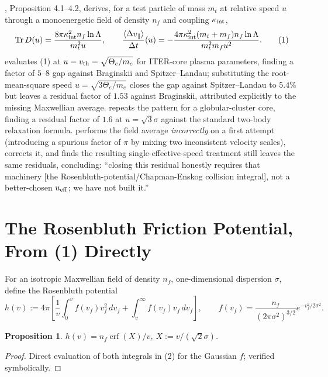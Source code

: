 \documentclass[12pt]{amsart}
\theoremstyle{plain}
\newtheorem{proposition}[theorem]{Proposition}
\theoremstyle{remark}
\begin{document}
\cite{Ebert2026Bath}, Proposition 4.1--4.2, derives, for a test particle of mass $m_t$ at relative speed $u$ through a monoenergetic field of density $n_f$ and coupling $\kappa_{\rm int}$,
\begin{equation}
\operatorname{Tr}D(u) = \frac{8\pi\kappa_{\rm int}^2n_f\ln\Lambda}{m_t^2u}, \qquad
\frac{\langle\Delta v_\parallel\rangle}{\Delta t}(u) = -\frac{4\pi\kappa_{\rm int}^2(m_t+m_f)n_f\ln\Lambda}{m_t^2m_fu^2}. \tag{1}
\end{equation}
\cite{Ebert2026Fusion} evaluates (1) at $u=v_{\rm th}=\sqrt{\Theta_e/m_e}$ for ITER-core plasma parameters, finding a factor of $5$--$8$ gap against Braginskii and Spitzer--Landau; substituting the root-mean-square speed $u=\sqrt{3\Theta_e/m_e}$ closes the gap against Spitzer--Landau to $5.4\%$ but leaves a residual factor of $1.53$ against Braginskii, attributed explicitly to the missing Maxwellian average. \cite{Ebert2026Cluster} repeats the pattern for a globular-cluster core, finding a residual factor of $1.6$ at $u=\sqrt3\sigma$ against the standard two-body relaxation formula. \cite{Ebert2026Residual} performs the field average \emph{incorrectly} on a first attempt (introducing a spurious factor of $\pi$ by mixing two inconsistent velocity scales), corrects it, and finds the resulting single-effective-speed treatment still leaves the same residuals, concluding: ``closing this residual honestly requires that machinery [the Rosenbluth-potential/Chapman-Enskog collision integral], not a better-chosen $u_{\rm eff}$; we have not built it.''

\section{The Rosenbluth Friction Potential, From (1) Directly}

For an isotropic Maxwellian field of density $n_f$, one-dimensional dispersion $\sigma$, define the Rosenbluth potential
\begin{equation}
h(v) := 4\pi\left[\frac1v\int_0^v f(v_f)v_f^2\,dv_f + \int_v^\infty f(v_f)v_f\,dv_f\right], \qquad f(v_f)=\frac{n_f}{(2\pi\sigma^2)^{3/2}}e^{-v_f^2/2\sigma^2}. \tag{2}
\end{equation}

\begin{proposition}\label{prop:h}
$h(v) = n_f\operatorname{erf}(X)/v$, $X:=v/(\sqrt2\sigma)$.
\end{proposition}

\begin{proof}
Direct evaluation of both integrals in (2) for the Gaussian $f$; verified symbolically.
\end{proof}
\end{document}
